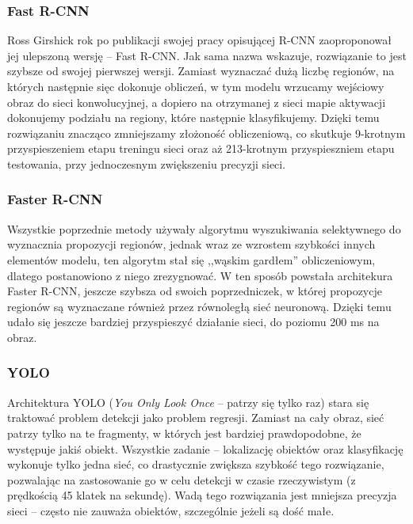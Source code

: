 \documentclass[a4paper,twoside,12pt]{book}
\newcommand{\obcy}[1]{\emph{#1}}
\newcommand{\ang}[1]{{\selectlanguage{british}\obcy{#1}}}
\begin{document}
{\subsubsection{Fast R-CNN\cite{girshick2015fast}}
{Ross Girshick rok po publikacji swojej pracy opisującej R-CNN zaoproponował jej ulepszoną wersję – Fast R-CNN. Jak sama nazwa wskazuje, rozwiązanie to jest szybsze od swojej pierwszej wersji. Zamiast wyznaczać dużą liczbę regionów, na których następnie sięc dokonuje obliczeń, w tym modelu wrzucamy wejściowy obraz do sieci konwolucyjnej, a dopiero na otrzymanej z sieci mapie aktywacji dokonujemy podziału na regiony, które następnie klasyfikujemy. Dzięki temu rozwiązaniu znacząco zmniejszamy złożoność obliczeniową, co skutkuje 9-krotnym przyspieszeniem etapu treningu sieci oraz aż 213-krotnym przyspieszniem etapu testowania, przy jednoczesnym zwiększeniu precyzji sieci.}
\subsubsection{Faster R-CNN\cite{ren2015faster}}
{Wszystkie poprzednie metody używały algorytmu wyszukiwania selektywnego do wyznacznia propozycji regionów, jednak wraz ze wzrostem szybkości innych elementów modelu, ten algorytm stał się ,,wąskim gardłem'' obliczeniowym, dlatego postanowiono z niego zrezygnować. W ten sposób powstała architekura Faster R-CNN, jeszcze szybsza od swoich poprzedniczek, w której propozycje regionów są wyznaczane również przez równoległą sieć neuronową. Dzięki temu udało się jeszcze bardziej przyspieszyć działanie sieci, do poziomu 200 ms na obraz.}
\subsubsection{YOLO\cite{redmon2016you}}
{Architektura YOLO (\ang{You Only Look Once} – patrzy się tylko raz) stara się traktować problem detekcji jako problem regresji. Zamiast na cały obraz, sieć patrzy tylko na te fragmenty, w których jest bardziej prawdopodobne, że występuje jakiś obiekt. Wszystkie zadanie – lokalizację obiektów oraz klasyfikację wykonuje tylko jedna sieć, co drastycznie zwiększa szybkość tego rozwiązanie, pozwalając na zastosowanie go w celu detekcji w czasie rzeczywistym (z prędkością 45 klatek na sekundę). Wadą tego rozwiązania jest mniejsza precyzja sieci – często nie zauważa obiektów, szczególnie jeżeli są dość małe.
}}
\end{document}
